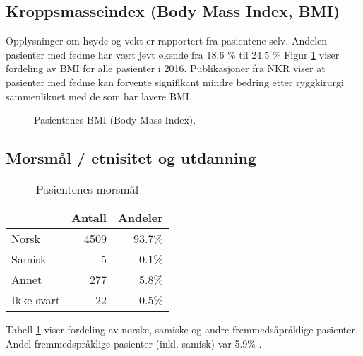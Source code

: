 

\subsection{Kroppsmasseindex (Body Mass Index, BMI)}



Opplysninger om høyde og vekt er rapportert fra pasientene selv.
Andelen pasienter med fedme har vært jevt økende fra 18.6 \%
til 24.5 \%
Figur \ref{fig:BMI} viser fordeling av BMI for alle pasienter i 2016. Publikasjoner fra NKR viser at pasienter med fedme kan forvente signifikant mindre bedring etter ryggkirurgi sammenliknet med de som har lavere BMI. 

\begin{figure}[ht]
\caption{\label{fig:BMI} Pasientenes BMI (Body Mass Index).}
\end{figure}





\subsection{Morsmål / etnisitet og utdanning}

\begin{table}[ht]
\centering
\begin{tabular}{lrr}
  \hline
 & Antall & Andeler \\ 
  \hline
Norsk & 4509 & 93.7\% \\ 
  Samisk & 5 & 0.1\% \\ 
  Annet & 277 & 5.8\% \\ 
  Ikke svart & 22 & 0.5\% \\ 
   \hline
\end{tabular}
\caption{Pasientenes morsmål} 
\label{tab:Morsm}
\end{table}


Tabell \ref{tab:Morsm} viser fordeling av norske, samiske og andre fremmedsåpråklige pasienter.
Andel fremmedspråklige pasienter (inkl. samisk) var 5.9\% . 

